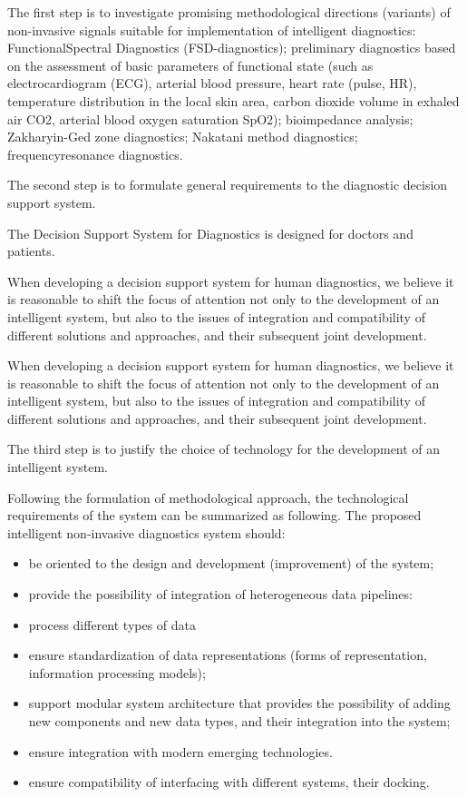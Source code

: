 \documentclass[twocolumn]{scndocument}
\begin{document}
The first step is to investigate promising methodological directions (variants) of non-invasive signals suitable
for implementation of intelligent diagnostics: FunctionalSpectral Diagnostics (FSD-diagnostics); preliminary diagnostics based on the assessment of basic parameters
of functional state (such as electrocardiogram (ECG),
arterial blood pressure, heart rate (pulse, HR), temperature distribution in the local skin area, carbon dioxide
volume in exhaled air CO2, arterial blood oxygen saturation SpO2); bioimpedance analysis; Zakharyin-Ged zone
diagnostics; Nakatani method diagnostics; frequencyresonance diagnostics.

The second step is to formulate general requirements
to the diagnostic decision support system.

The Decision Support System for Diagnostics is designed for doctors and patients.

When developing a decision support system for human
diagnostics, we believe it is reasonable to shift the
focus of attention not only to the development of an
intelligent system, but also to the issues of integration
and compatibility of different solutions and approaches,
and their subsequent joint development.

When developing a decision support system for human
diagnostics, we believe it is reasonable to shift the
focus of attention not only to the development of an
intelligent system, but also to the issues of integration
and compatibility of different solutions and approaches,
and their subsequent joint development.

The third step is to justify the choice of technology
for the development of an intelligent system.

Following the formulation of methodological approach, the technological requirements of the system can
be summarized as following. The proposed intelligent
non-invasive diagnostics system should:

\vspace{-5pt}
\begin{itemize}
    \setlength{\itemsep}{-3pt} 
    \setlength{\parsep}{-3pt}
    \item be oriented to the design and development (improvement) of the system;
    \item provide the possibility of integration of heterogeneous data pipelines:
    \item process different types of data
    \item ensure standardization of data representations
(forms of representation, information processing
models);
    \item support modular system architecture that provides
the possibility of adding new components and new
data types, and their integration into the system;
    \item ensure integration with modern emerging technologies.
    \item ensure compatibility of interfacing with different
systems, their docking.
\end{itemize}
\vspace{-5pt}
\end{document}
